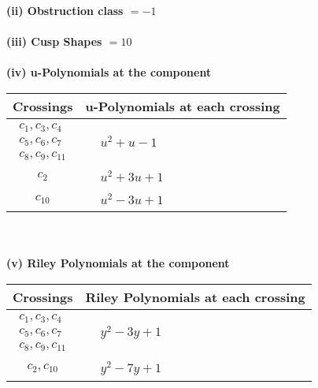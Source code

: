\documentclass[1p]{elsarticle_modified}
\theoremstyle{definition}
\begin{document}
\flushleft \textbf{(ii) Obstruction class $= -1$}\\~\\
\flushleft \textbf{(iii) Cusp Shapes $= 10$}\\~\\
\newpage\renewcommand{\arraystretch}{1}
\flushleft \textbf{(iv) u-Polynomials at the component}\newline \\
\begin{tabular}{m{50pt}|m{274pt}}
Crossings & \hspace{64pt}u-Polynomials at each crossing \\
\hline $$\begin{aligned}c_{1},c_{3},c_{4}\\c_{5},c_{6},c_{7}\\c_{8},c_{9},c_{11}\end{aligned}$$&$\begin{aligned}
&u^2+u-1
\end{aligned}$\\
\hline $$\begin{aligned}c_{2}\end{aligned}$$&$\begin{aligned}
&u^2+3 u+1
\end{aligned}$\\
\hline $$\begin{aligned}c_{10}\end{aligned}$$&$\begin{aligned}
&u^2-3 u+1
\end{aligned}$\\
\hline
\end{tabular}\\~\\
\newpage\renewcommand{\arraystretch}{1}
\flushleft \textbf{(v) Riley Polynomials at the component}\newline \\
\begin{tabular}{m{50pt}|m{274pt}}
Crossings & \hspace{64pt}Riley Polynomials at each crossing \\
\hline $$\begin{aligned}c_{1},c_{3},c_{4}\\c_{5},c_{6},c_{7}\\c_{8},c_{9},c_{11}\end{aligned}$$&$\begin{aligned}
&y^2-3 y+1
\end{aligned}$\\
\hline $$\begin{aligned}c_{2},c_{10}\end{aligned}$$&$\begin{aligned}
&y^2-7 y+1
\end{aligned}$\\
\hline
\end{tabular}\\~\\
\end{document}
